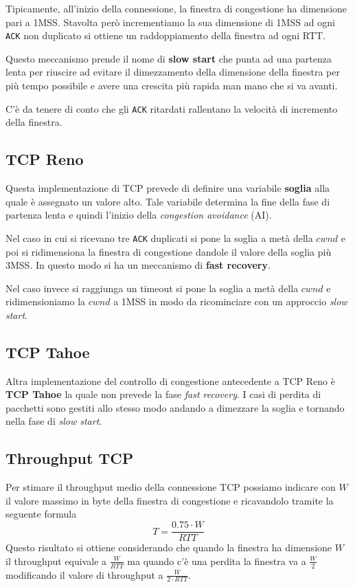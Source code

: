 Tipicamente, all'inizio della connessione, la finestra di congestione ha dimensione pari a 1MSS.
Stavolta però incrementiamo la sua dimensione di 1MSS ad ogni \verb|ACK| non duplicato si ottiene
un raddoppiamento della finestra ad ogni RTT.

Questo meccanismo prende il nome di \textbf{slow start} che punta ad una partenza lenta per 
riuscire ad evitare il dimezzamento della dimensione della finestra per più tempo possibile e
avere una crescita più rapida man mano che si va avanti.

C'è da tenere di conto che gli \verb|ACK| ritardati rallentano la velocità di incremento della
finestra.

\subsection{TCP Reno}
Questa implementazione di TCP prevede di definire una variabile \textbf{soglia} alla quale è 
assegnato un valore alto. Tale variabile determina la fine della fase di partenza lenta e quindi 
l'inizio della \emph{congestion avoidance} (AI).

Nel caso in cui si ricevano tre \verb|ACK| duplicati si pone la soglia a metà della $cwnd$ e poi
si ridimensiona la finestra di congestione dandole il valore della soglia più 3MSS. In questo modo
si ha un meccanismo di \textbf{fast recovery}.

Nel caso invece si raggiunga un timeout si pone la soglia a metà della $cwnd$ e ridimensioniamo la
$cwnd$ a 1MSS in modo da ricominciare con un approccio \emph{slow start}.

\subsection{TCP Tahoe}
Altra implementazione del controllo di congestione antecedente a TCP Reno è \textbf{TCP Tahoe} la
quale non prevede la fase \emph{fast recovery}. I casi di perdita di pacchetti sono gestiti allo 
stesso modo andando a dimezzare la soglia e tornando nella fase di \emph{slow start}.

\subsection{Throughput TCP}
Per stimare il throughput medio della connessione TCP possiamo indicare con $W$ il valore massimo
in byte della finestra di congestione e ricavandolo tramite la seguente formula
\[ T = \frac{0.75 \cdot W}{RTT} \]
Questo risultato si ottiene considerando che quando la finestra ha dimensione $W$ il throughput 
equivale a $\frac{W}{RTT}$ ma quando c'è una perdita la finestra va a $\frac{W}{2}$ modificando il
valore di throughput a $\frac{W}{2 \cdot RTT}$.

